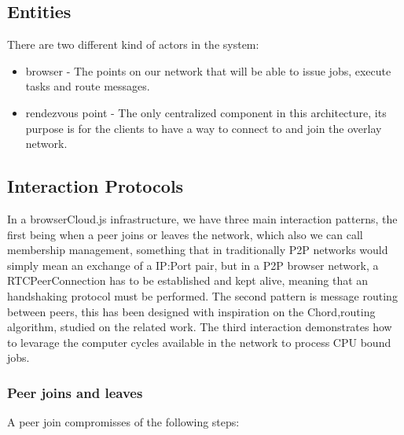 \subsection{Entities}

There are two different kind of actors in the system:

\begin{itemize}
    \item browser - The points on our network that will be able to issue jobs, execute tasks and route messages.
    \item rendezvous point - The only centralized component in this architecture, its purpose is for the clients to have a way to connect to and join the overlay network. 
\end{itemize}

\subsection{Interaction Protocols}

In a browserCloud.js infrastructure, we have three main interaction patterns, the first being when a peer joins or leaves the network, which also we can call membership management, something that in traditionally P2P networks would simply mean an exchange of a IP:Port pair, but in a P2P browser network, a RTCPeerConnection has to be established and kept alive, meaning that an handshaking protocol must be performed. The second pattern is message routing between peers, this has been designed with inspiration on the Chord\cite{Stoica2001},routing algorithm, studied on the related work. The third interaction demonstrates how to levarage the computer cycles available in the network to process CPU bound jobs.

\subsubsection{Peer joins and leaves}

A peer join compromisses of the following steps:

